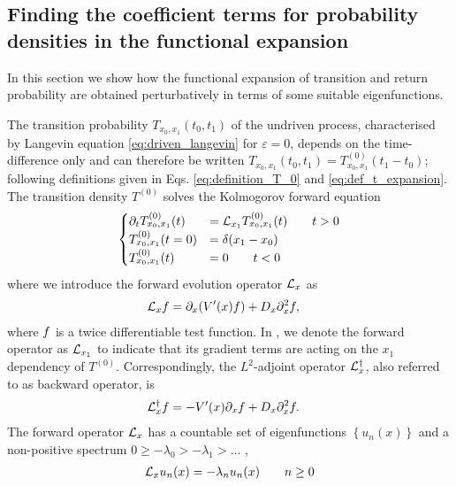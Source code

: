 \documentclass[%
 reprint,
superscriptaddress,
nofootinbib,
 amsmath,amssymb,
 aps,
prx,
]{revtex4-2}
\begin{document}
\subsection{Finding the coefficient terms for probability densities in the functional expansion}
\label{subsec:finding_expansion_terms}
In this section we show how the functional expansion of transition and return probability are obtained perturbatively in terms of some suitable eigenfunctions.

The transition probability $T_{x_0,x_1}(t_0,t_1)$ of the undriven process, characterised by Langevin equation \eqref{eq:driven_langevin} for $\varepsilon=0$, depends on the time-difference only and can therefore be written $T_{x_0,x_1}(t_0,t_1) = T^{(0)}_{x_0,x_1}(t_1-t_0)$; following definitions given in Eqs. \eqref{eq:definition_T_0} and \eqref{eq:def_t_expansion}. The transition density $T^{(0)}$ solves the Kolmogorov forward equation
\begin{align}
\label{eq:Kolmogorov_forward_equation_epsilon_0}
	\begin{cases}
		\partial_t T^{(0)}_{x_0,x_1}(t) &= \mathcal{L}_{x_1}  T^{(0)}_{x_0,x_1}(t)  \qquad t > 0\\
		T^{(0)}_{x_0,x_1}(t=0) &= \delta(x_1 - x_0) \\
		T^{(0)}_{x_0,x_1}(t)&=0  \qquad t < 0
\end{cases}
\end{align}
where we introduce the forward evolution operator $\mathcal{L}_x$ as
\begin{align}
	\mathcal{L}_x f &= \partial_x (V'(x) f) + D_x \partial_x^2 f ,
	\label{eq:forward_equation}
\end{align}
where $f$ is a twice differentiable test function. In , we denote the forward operator as $\mathcal{L}_{x_1}$ to indicate that its gradient terms are acting on the $x_1$ dependency of $T^{(0)}$. Correspondingly, the $L^2$-adjoint operator $\mathcal{L}_x^{\dagger}$, also referred to as backward operator, is
\begin{align}
	\mathcal{L}_x^{\dagger} f &= -V'(x) \partial_x f + D_x \partial_x^2 f.
\end{align}
The forward operator $\mathcal{L}_x$ has a countable set of eigenfunctions $\left\{ u_n(x) \right\}$ and a non-positive spectrum $0 \geq -\lambda_0 > - \lambda_1 > \ldots$ \cite{pavliotis2014},
\begin{align}
	\mathcal{L}_x u_n(x) = -\lambda_n u_n(x) \qquad n \geq 0
	\label{eq:def_u_n}
\end{align}
\end{document}

